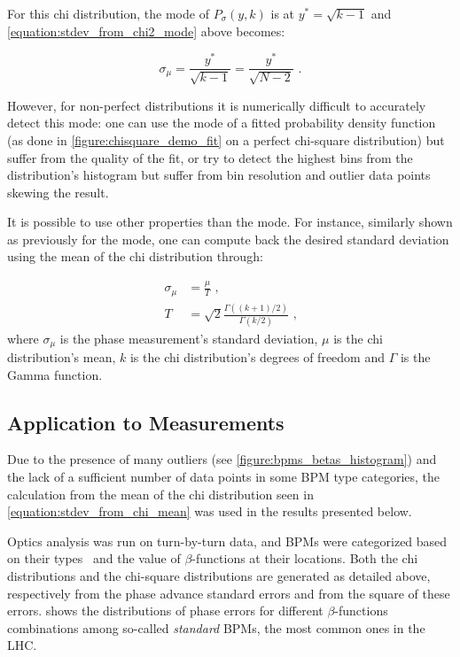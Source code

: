 For this chi distribution, the mode of \(P_{\sigma}(y , k)\) is at \(y^*=\sqrt{k-1}\) and \cref{equation:stdev_from_chi2_mode} above becomes:

\begin{equation}
    \sigma_{\mu} = \frac{y^*}{\sqrt{k - 1}} = \frac{y^*}{\sqrt{N - 2}} \text{ .}
    \label{equation:stdev_from_mode}
\end{equation}

However, for non-perfect distributions it is numerically difficult to accurately detect this mode: one can use the mode of a fitted probability density function (as done in \cref{figure:chisquare_demo_fit} on a perfect chi-square distribution) but suffer from the quality of the fit, or try to detect the highest bins from the distribution's histogram but suffer from bin resolution and outlier data points skewing the result.

It is possible to use other properties than the mode.
For instance, similarly shown as previously for the mode, one can compute back the desired standard deviation using the mean of the chi distribution through:

\begin{equation}
	\begin{aligned}
        \sigma_{\mu} &= \frac{\mu}{T} \text{ ,} \\
        T            &= \sqrt{2} \frac{\Gamma((k + 1) / 2)}{\Gamma(k / 2)} \text{ ,}
	\end{aligned}	
    \label{equation:stdev_from_chi_mean}
\end{equation}
where \(\sigma_{\mu}\) is the phase measurement's standard deviation, \(\mu\) is the chi distribution's mean, \(k\) is the chi distribution's degrees of freedom and \(\Gamma\) is the Gamma function.

\subsection*{Application to Measurements}

Due to the presence of many outliers (see \cref{figure:bpms_betas_histogram}) and the lack of a sufficient number of data points in some BPM type categories, the calculation from the mean of the chi distribution seen in \cref{equation:stdev_from_chi_mean} was used in the results presented below.

Optics analysis was run on turn-by-turn data, and BPMs were categorized based on their types~\cite{CERN:Equipment_Codes} and the value of \(\beta\)-functions at their locations.
Both the chi distributions and the chi-square distributions are generated as detailed above, respectively from the phase advance standard errors and from the square of these errors.
 shows the distributions of phase errors for different \(\beta\)-functions combinations among so-called \textit{standard} BPMs, the most common ones in the LHC.

